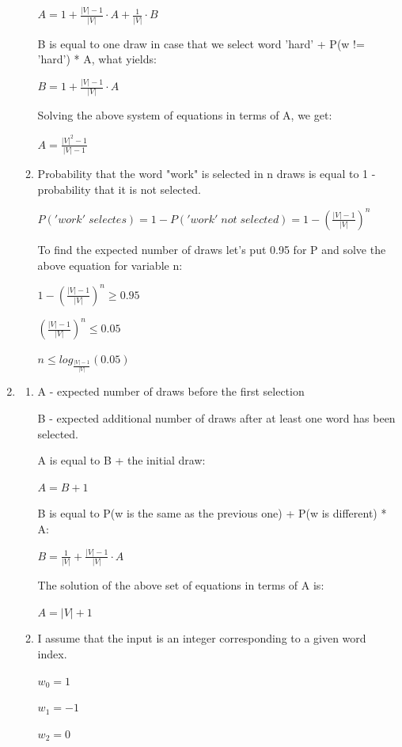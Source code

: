 \documentclass{article}
\begin{document}
\begin{enumerate}[label = (\alph*)]
\begin{enumerate}[label = (\roman*)]
	$A = 1 + \frac{|V|-1}{|V|} \cdot A + \frac{1}{|V|} \cdot B$   
	
	B is equal to one draw in case that we select word 'hard' + P(w != 'hard') * A, what yields: 
	
	$B = 1 + \frac{|V|-1}{|V|} \cdot A$
	
	Solving the above system of equations in terms of A, we get:
	
	$A = \frac{|V|^2-1}{|V|-1}$ 
    
    \item
    Probability that the word "work" is selected in n draws is equal to 1 - probability that it is not selected. 
    
    $P('work' 
   \; selectes) = 1 - P('work' \; not \; selected) = 1 - (\frac{|V|-1}{|V|})^n$
   
   To find the expected number of draws let's put 0.95 for P and solve the above equation for variable n:
   
   $1 - (\frac{|V|-1}{|V|})^n \geq 0.95$
   
   $(\frac{|V|-1}{|V|})^n \leq 0.05$
   
   $n \leq log_{\frac{|V|-1}{|V|}}(0.05)$
    
	\end{enumerate}
	
	\item
    \begin{enumerate}[label = (\roman*)]
    \item
    A - expected number of draws before the first selection
    
    B - expected additional number of draws after at least one word has been selected.
    
    A is equal to B + the initial draw:
    
    $A=B+1$
    
    B is equal to P(w is the same as the previous one) + P(w is different) * A:
    
    $B = \frac{1}{|V|} + \frac{|V|-1}{|V|} \cdot A$
    
    The solution of the above set of equations in terms of A is:
    
    $A = |V|+1$
    
    \item
    I assume that the input is an integer corresponding to a given word index.
    
    $w_0=1$
    
    $w_1=-1$
    
    $w_2=0$
    

\end{enumerate}
\end{enumerate}
\end{document}
